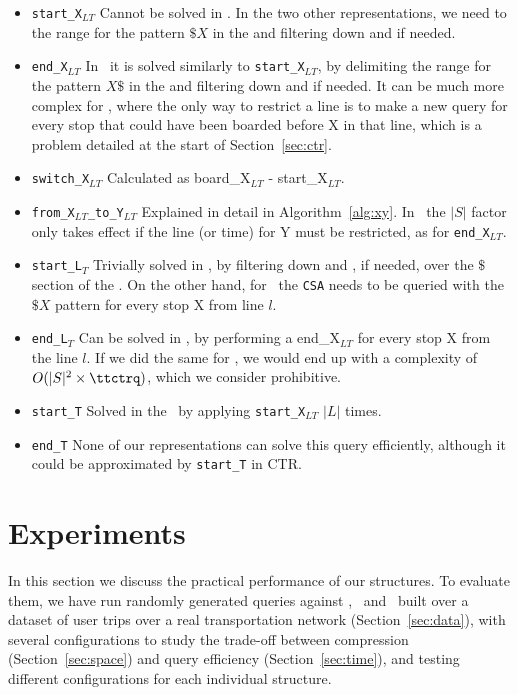 \begin{itemize}
        \item \texttt{start\_X$_{LT}$} Cannot be solved in \acumm. In the two other representations, we need to the range for the pattern $\$X$ in the  and filtering down  and  if needed.
        \item \texttt{end\_X$_{LT}$} In \ctr~it is solved similarly to \texttt{start\_X$_{LT}$}, by delimiting the range for the pattern $X\$$ in the  and filtering down  and  if needed. It can be much more complex for \ttctr, where the only way to restrict a line is to make a new query for every stop that could have been boarded before X in that line, which is a problem detailed at the start of Section~\ref{sec:ctr}.
        \item \texttt{switch\_X$_{LT}$} Calculated as board\_X$_{LT}$ - start\_X$_{LT}$.
        \item \texttt{from\_X$_{LT}$\_to\_Y$_{LT}$} Explained in detail in Algorithm~\ref{alg:xy}. In \ttctr~the $|S|$ factor only takes effect if the line (or time) for Y must be restricted, as for \texttt{end\_X$_{LT}$}.
        \item \texttt{start\_L$_T$} Trivially solved in \ctr, by filtering down  and , if needed, over the $\$$ section of the . On the other hand, for \ttctr~the \texttt{CSA} needs to be queried with the $\$X$ pattern for every stop X from line $l$.
        \item \texttt{end\_L$_T$} Can be solved in \ctr, by performing a end\_X$_{LT}$ for every stop X from the line $l$. If we did the same for \ttctr, we would end up with a complexity of $O(|S|^2\times\ttctrq)$, which we consider prohibitive.
        \item \texttt{start\_T} Solved in the \ctr~by applying \texttt{start\_X$_{LT}$} $|L|$ times.
        \item \texttt{end\_T} None of our representations can solve this query efficiently, although it could be approximated by \texttt{start\_T} in CTR.
    \end{itemize}
	
\section{Experiments}
	In this section we discuss the practical performance of our structures. To evaluate them, we have run randomly generated queries against \acumm, \ttctr~and \ctr~built over a dataset of user trips over a real transportation network (Section~\ref{sec:data}), with several configurations to study the trade-off between compression (Section~\ref{sec:space}) and query efficiency (Section~\ref{sec:time}), and testing different configurations for each individual structure.

